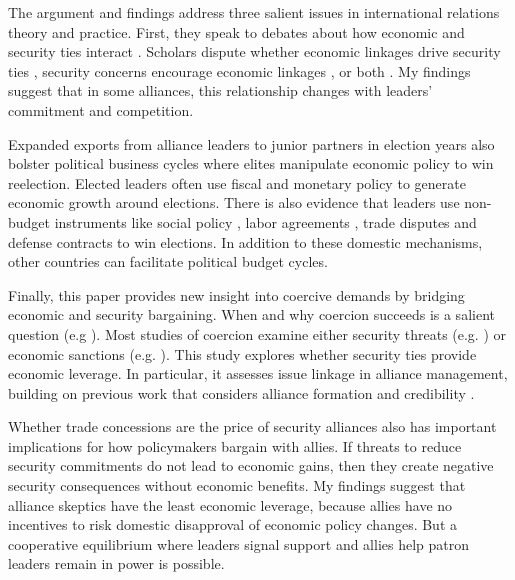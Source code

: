 \documentclass[12pt]{article}
\begin{document}
The argument and findings address three salient issues in international relations theory and practice. 
First, they speak to debates about how economic and security ties interact \citep{Mastanduno2009, Poast2019}. 
Scholars dispute whether economic linkages drive security ties \citep{BiglaiserDeRouen2007, Fordham2010, Kimball2010}, security concerns encourage economic linkages \citep{Gowa1995, Li2003, LongLeeds2006, GowaMansfield2004}, or both \citep{BiglaiserDeRouen2009, KinneBunte2018}. 
My findings suggest that in some alliances, this relationship changes with leaders' commitment and competition.


Expanded exports from alliance leaders to junior partners in election years also bolster political business cycles where elites manipulate economic policy to win reelection. 
Elected leaders often use fiscal \citep{Rogoff1987} and monetary policy \citep{ClarkHallerberg2000} to generate economic growth around elections. 
There is also evidence that leaders use non-budget instruments like social policy \citep{Philips2020}, labor agreements \citep{Ahlquist2010}, trade disputes \citep{Conconietal2017} and defense contracts \citep{DerouenHeo2000} to win elections. 
In addition to these domestic mechanisms, other countries can facilitate political budget cycles. 


Finally, this paper provides new insight into coercive demands by bridging economic and security bargaining.
When and why coercion succeeds is a salient question (e.g \citep{Sechser2010, Sechser2018, Cebuletal2021}).  
Most studies of coercion examine either security threats (e.g. \citep{HorowitzReiter2001, Sechser2011}) or economic sanctions (e.g. \citep{Marinov2005, Allen2008, Escriba-FolchWright2010}).
This study explores whether security ties provide economic leverage. 
In particular, it assesses issue linkage in alliance management, building on previous work that considers alliance formation \citep{Poast2012} and credibility \citep{Davis2008, Poast2013}. 


Whether trade concessions are the price of security alliances also has important implications for how policymakers bargain with allies. 
If threats to reduce security commitments do not lead to economic gains, then they create negative security consequences without economic benefits. 
My findings suggest that alliance skeptics have the least economic leverage, because allies have no incentives to risk domestic disapproval of economic policy changes.
But a cooperative equilibrium where leaders signal support and allies help patron leaders remain in power is possible. 
\end{document}

